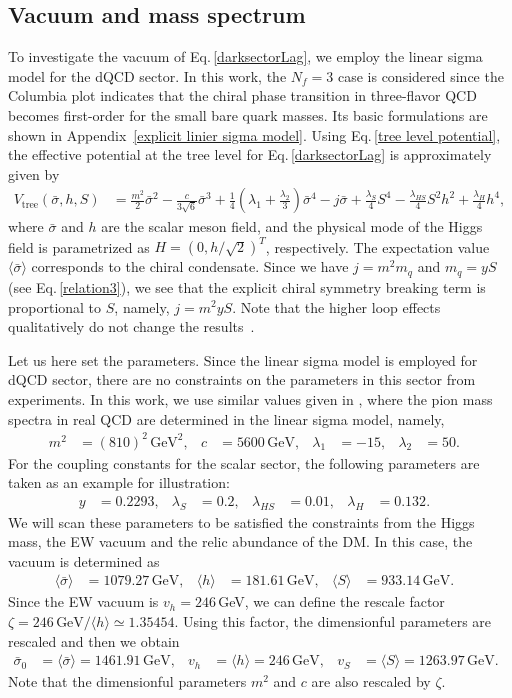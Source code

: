 \documentclass[a4paper,preprint,superscriptaddress,preprintnumbers,nofootinbib]{revtex4}
\newcommand{\al}[1]{\begin{align}#1\end{align}}
\newcommand{\fn}[1]{\!\left(#1\right)}
\newcommand{\bra}{\langle}
\newcommand{\ket}{\rangle}
\begin{document}
\subsection{Vacuum and mass spectrum}
To investigate the vacuum of Eq.\,\eqref{darksectorLag}, we employ the linear sigma model for the dQCD sector.
In this work, the $N_f=3$ case is considered since the Columbia plot indicates that the chiral phase transition in three-flavor QCD becomes first-order for the small bare quark masses. 
Its basic formulations are shown in Appendix~\ref{explicit linier sigma model}.
Using Eq.\,\eqref{tree level potential}, the effective potential at the tree level for Eq.\,\eqref{darksectorLag} is approximately given by
\al{
V_\text{tree}\fn{{\bar \sigma},h,S}&= 
\frac{m^2}{2} {\bar \sigma}^2
-\frac{c}{3\sqrt{6}}{\bar\sigma}^3 
+\frac{1}{4}\left( \lambda_1+\frac{\lambda_2}{3}\right) {\bar\sigma}^4
-j{\bar\sigma}
+\frac{\lambda_S}{4}S^4 -\frac{\lambda_{HS}}{4}S^2h^2
+\frac{\lambda_H}{4}h^4,
} 
where $\bar \sigma$ and $h$ are the scalar meson field, and the physical mode of the Higgs field is parametrized as $H=(0,h/\sqrt{2})^T$, respectively.
The expectation value $\bra \bar \sigma \ket$ corresponds to the chiral condensate.
Since we have $j=m^2m_q$ and $m_q=yS$ (see Eq.\,\eqref{relation3}), we see that the explicit chiral symmetry breaking term is proportional to $S$, namely, $j=m^2yS$.
Note that the higher loop effects qualitatively do not change the results~\cite{Lenaghan:1999si,Lenaghan:2000ey}.

Let us here set the parameters.
Since the linear sigma model is employed for dQCD sector, there are no constraints on the parameters in this sector from experiments.
In this work, we use similar values given in \cite{Lenaghan:1999si}, where the pion mass spectra in real QCD are determined in the linear sigma model, namely,
\al{
m^2&=(810)^2\, \text{GeV}^2,&
c&=5600\, \text{GeV},&
\lambda_1&=-15,&
\lambda_2&=50.&
\label{darksector parameters}
}
For the coupling constants for the scalar sector, the following parameters are taken as an example for illustration:
\al{
y&=0.2293,&
\lambda_S&=0.2,&
\lambda_{HS}&=0.01,&
\lambda_H&=0.132.&
\label{darksector higgs parameters}
}
We will scan these parameters to be satisfied the constraints from the Higgs mass, the EW vacuum and the relic abundance of the DM.
In this case, the vacuum is determined as
\al{
\bra \bar\sigma \ket &=1079.27\,\text{GeV},&
\bra h \ket &=181.61\,\text{GeV},&
\bra S \ket &=933.14\,\text{GeV}.&
}
Since the EW vacuum is $v_h=246$\,GeV, we can define the rescale factor $\zeta=246\, \text{GeV}/\bra h \ket\simeq 1.35454$.
Using this factor, the dimensionful parameters are rescaled and then we obtain
\al{
\bar \sigma_0&=\bra \bar\sigma \ket =1461.91\,\text{GeV},&
v_h&=\bra h \ket =246\,\text{GeV},&
v_S&=\bra S \ket =1263.97\,\text{GeV}.&
\label{vacua}
}
Note that the dimensionful parameters $m^2$ and $c$ are also rescaled by $\zeta$. 
\end{document}

